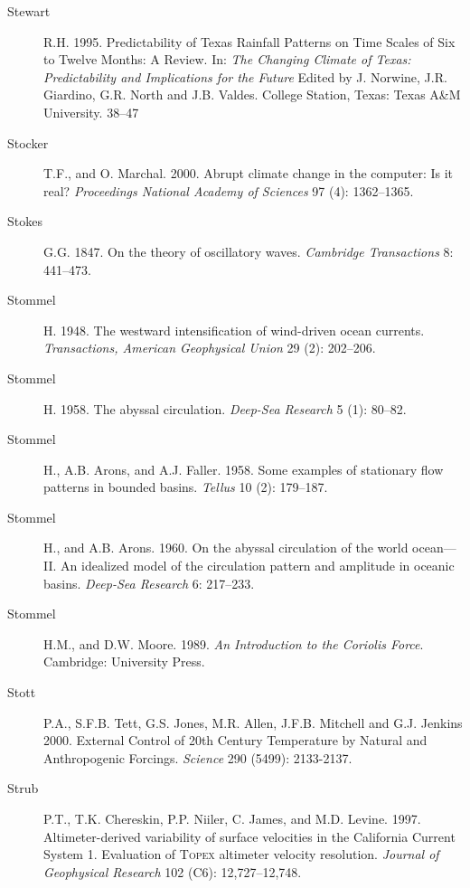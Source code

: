 \begin{description}
\item [Stewart]R.H. 1995. Predictability of Texas Rainfall Patterns on Time
Scales of Six to Twelve Months: A Review. In: \textit{The Changing Climate of
Texas: Predictability and Implications for the Future} Edited by J. Norwine, J.R.
Giardino, G.R. North and J.B. Valdes. College Station, Texas: Texas A\&M
University. 38--47

\item [Stocker]T.F., and O. Marchal. 2000. Abrupt climate change in the
computer: Is it real? \textit{Proceedings National Academy of Sciences} 97 (4):
1362--1365.

\item [Stokes]G.G. 1847. On the theory of oscillatory waves. \textit{Cambridge Transactions} 8: 441--473.

\item [Stommel]H. 1948. The westward intensification of wind-driven ocean
currents. \textit{Transactions, American Geophysical Union} 29 (2): 202--206.

\item[Stommel]H. 1958. The abyssal circulation. \textit{Deep-Sea Research} 5 (1):
80--82.

\item [Stommel]H., A.B. Arons, and A.J. Faller. 1958. Some examples of
stationary flow patterns in bounded basins. \textit{Tellus} 10 (2): 179--187.

\item [Stommel]H., and A.B. Arons. 1960. On the abyssal circulation of the
world ocean---II. An idealized model of the circulation pattern and amplitude in
oceanic basins. \textit{Deep-Sea Research} 6: 217--233.

\item [Stommel]H.M., and D.W. Moore. 1989. \textit{An Introduction to the Coriolis Force}.  Cambridge: University Press.

\item [Stott]P.A., S.F.B. Tett, G.S. Jones, M.R. Allen, J.F.B. Mitchell and G.J. Jenkins 2000. External Control of 20th Century Temperature by Natural and Anthropogenic Forcings. \textit{Science} 290  (5499): 2133-2137.

\item [Strub]P.T., T.K. Chereskin, P.P. Niiler, C. James, and M.D. Levine.
1997. Altimeter-derived variability of surface velocities in the California
Current System 1. Evaluation of \textsc{Topex} altimeter velocity resolution.
\textit{Journal of Geophysical Research} 102 (C6): 12,727--12,748.


\end{description}
